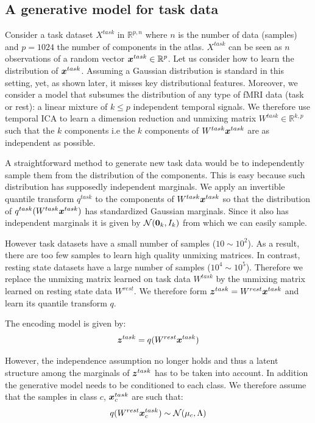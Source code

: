 \subsection{A generative model for task data}
Consider a task dataset $X^{task}$ in $\mathbb{R}^{p,n}$ where $n$ is the number of
data (samples) and $p=1024$ the number of components in the atlas. $X^{task}$ can be seen as $n$
observations of a random vector $\boldsymbol{x}^{task} \in \mathbb{R}^p$. Let us
consider how to learn the distribution of $\boldsymbol{x}^{task}$. 
%
Assuming a Gaussian distribution is standard in this setting, yet, as
shown later, it misses key distributional features.
%
Moreover, we consider a model that subsumes the distribution of any type of
fMRI data (task or rest): a linear mixture of $k \leq p$ independent temporal signals.
%
We therefore use temporal ICA to learn a dimension reduction and unmixing matrix
$W^{task} \in \mathbb{R}^{k, p}$ such that the $k$ components i.e the $k$ components of
$W^{task} \boldsymbol{x}^{task}$ are as
independent as possible.

A straightforward method to generate new task data would be to
independently sample them from the distribution of the components.
%
This is easy because such distribution has supposedly independent marginals.
We apply an invertible quantile transform $q^{task}$ to the components of $W^{task} \boldsymbol{x}^{task}$ so that
the distribution of $q^{task}(W^{task} \boldsymbol{x}^{task})$ has standardized Gaussian
marginals. Since it also has independent marginals it is given by $\mathcal{N}({\boldsymbol{0}}_k, I_k)$
from which we can easily sample.

However task datasets   have a small number of samples ($10 \sim 10^2$). As a
result, there are too few samples to learn high quality unmixing matrices. In
contrast, resting state datasets have a large number of samples ($10^4 \sim 10^5$).
Therefore we replace the unmixing matrix learned on task data $W^{task}$ by the
unmixing matrix learned on resting state data $W^{rest}$.
We therefore form $\boldsymbol{z}^{task} = W^{rest} \boldsymbol{x}^{task}$ and learn its quantile
transform $q$.

The encoding model is given by:
\begin{align}
  \boldsymbol{z}^{task} = q(W^{rest} \boldsymbol{x}^{task})
\end{align}

However, the independence assumption no longer holds and thus a latent structure among the marginals of
$\boldsymbol{z}^{task}$ has to be taken into account. In addition the generative model needs
to be conditioned to each class. We therefore assume that the samples in class
$c$, $\boldsymbol{x}_c^{task}$ are such that:
\begin{align}
q(W^{rest}\boldsymbol{x}^{task}_c) \sim \mathcal{N}( \mu_c, \Lambda)
\end{align}

